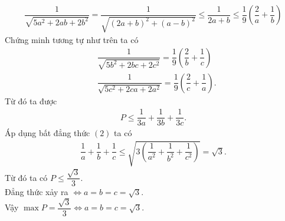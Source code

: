 \begin{ex}
{\begin{align*}
	\dfrac{1}{\sqrt{5a^2+2ab+2b^2}}=\dfrac{1}{\sqrt{(2a+b)^2+(a-b)^2}}\leq \dfrac{1}{2a+b} \leq	\dfrac{1}{9}\left(\dfrac{2}{a}+\dfrac{1}{b} \right)
\end{align*}
Chứng minh tương tự như trên ta có
\begin{align*}
	&\dfrac{1}{\sqrt{5b^2+2bc+2c^2}}=\dfrac{1}{9}\left(\dfrac{2}{b}+\dfrac{1}{c} \right)\\
	&\dfrac{1}{\sqrt{5c^2+2ca+2a^2}}=\dfrac{1}{9}\left(\dfrac{2}{c}+\dfrac{1}{a} \right).
\end{align*}
Từ đó ta được 
\begin{align*}
	P \leq \dfrac{1}{3a}+\dfrac{1}{3b}+\dfrac{1}{3c}.
\end{align*}
Áp dụng bất đẳng thức $(2)$ ta có
\begin{align*}
	\dfrac{1}{a}+\dfrac{1}{b}+\dfrac{1}{c} \leq \sqrt{3 \left(\dfrac{1}{a^2}+\dfrac{1}{b^2}+\dfrac{1}{c^2} \right)}=\sqrt{3}.
\end{align*}
Từ đó ta có $P\leq \dfrac{\sqrt{3}}{3}$.\\
Đẳng thức xảy ra $\Leftrightarrow a=b=c=\sqrt{3}$.\\
Vậy $\max P = \dfrac{\sqrt{3}}{3} \Leftrightarrow a= b= c = \sqrt{3}$.
}
\end{ex}
